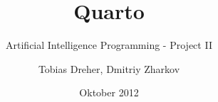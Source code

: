 
 

\title{Quarto}
\subtitle{Artificial Intelligence Programming - Project II}
\author{Tobias Dreher, Dmitriy Zharkov}
\date{Oktober 2012}
\newcommand{\covertitle}{Quarto}
\newcommand{\coversubtitle}{Artificial Intelligence Programming - Project II}
\newcommand{\coverauthor}{Tobias Dreher, Dmitriy Zharkov}
\newcommand{\coverdate}{Oktober 2012}



  
  \newpage

  \renewcommand{\thepage}{\Roman{page}}
  \setcounter{page}{1}
  
  \begin{spacing}{1.3}
	  \setcounter{tocdepth}{1}
	  \tableofcontents
  \end{spacing}
  \newpage

  \renewcommand{\thepage}{\arabic{page}}
  \setcounter{page}{1}

  
  
  


